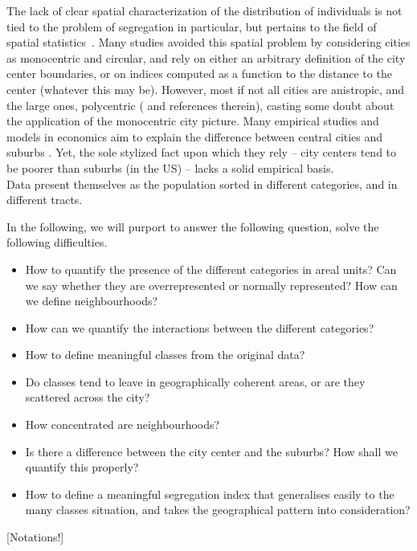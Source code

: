 The lack of clear spatial characterization of the distribution of individuals is
not tied to the problem of segregation in particular, but pertains to the field
of spatial statistics~\cite{Ripley:1981}. Many studies avoided this spatial
problem by considering cities as monocentric and circular, and rely on either an
arbitrary definition of the city center boundaries, or on indices computed as a
function to the distance to the center (whatever this may be). However, most if
not all cities are anistropic, and the large ones, polycentric
(\cite{Louf:2013_polycentric}
and references therein), casting some doubt about the application of the
monocentric city picture. Many empirical studies and models in economics aim to
explain the difference between central cities and suburbs \cite{Glaeser:2008,
Brueckner:1999}. Yet, the sole stylized fact upon which they rely -- city centers
tend to be poorer than suburbs (in the US) -- lacks a solid empirical
basis.\\

Data present themselves as the population sorted in different categories, and in
different tracts.

In the following, we will purport to answer the following question, solve the
following difficulties.

\begin{itemize}
    \item How to quantify the presence of the different categories in areal
        units? Can we say whether they are overrepresented or normally
        represented? How can we define neighbourhoods?
    \item How can we quantify the interactions between the different categories?
    \item How to define meaningful classes from the original data?
    \item Do classes tend to leave in geographically coherent areas, or are they
        scattered across the city?
    \item How concentrated are neighbourhoods?
    \item Is there a difference between the city center and the suburbs? How
        shall we quantify this properly?
    \item How to define a meaningful segregation index that generalises easily
        to the many classes situation, and takes the geographical pattern into
        consideration?
\end{itemize}

[Notations!]

